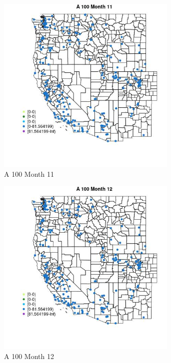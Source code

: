 \begin{figure} 
\centering  
\includegraphics[width=0.77\textwidth]{Code_Outputs/Report_ML_input_PM25_Step4_part_e_de_duplicated_aveswNAs_MapObsMo11A_100.jpg} 
\caption{\label{fig:Report_ML_input_PM25_Step4_part_e_de_duplicated_aveswNAsMapObsMo11A_100}A 100 Month 11} 
\end{figure} 
 

\begin{figure} 
\centering  
\includegraphics[width=0.77\textwidth]{Code_Outputs/Report_ML_input_PM25_Step4_part_e_de_duplicated_aveswNAs_MapObsMo12A_100.jpg} 
\caption{\label{fig:Report_ML_input_PM25_Step4_part_e_de_duplicated_aveswNAsMapObsMo12A_100}A 100 Month 12} 
\end{figure} 
 

